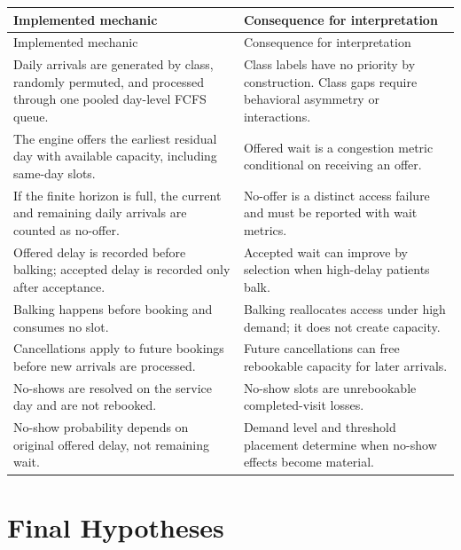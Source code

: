 \documentclass[11pt]{article}
\begin{document}
\begin{longtable}{P{0.34\textwidth} P{0.58\textwidth}}
\toprule
Implemented mechanic & Consequence for interpretation \\
\midrule
\endfirsthead
\toprule
Implemented mechanic & Consequence for interpretation \\
\midrule
\endhead
Daily arrivals are generated by class, randomly permuted, and processed through
one pooled day-level FCFS queue. &
Class labels have no priority by construction. Class gaps require behavioral
asymmetry or interactions. \\

The engine offers the earliest residual day with available capacity, including
same-day slots. &
Offered wait is a congestion metric conditional on receiving an offer. \\

If the finite horizon is full, the current and remaining daily arrivals are
counted as no-offer. &
No-offer is a distinct access failure and must be reported with wait metrics. \\

Offered delay is recorded before balking; accepted delay is recorded only after
acceptance. &
Accepted wait can improve by selection when high-delay patients balk. \\

Balking happens before booking and consumes no slot. &
Balking reallocates access under high demand; it does not create capacity. \\

Cancellations apply to future bookings before new arrivals are processed. &
Future cancellations can free rebookable capacity for later arrivals. \\

No-shows are resolved on the service day and are not rebooked. &
No-show slots are unrebookable completed-visit losses. \\

No-show probability depends on original offered delay, not remaining wait. &
Demand level and threshold placement determine when no-show effects become
material. \\
\bottomrule
\end{longtable}

\section*{Final Hypotheses}
\end{document}
